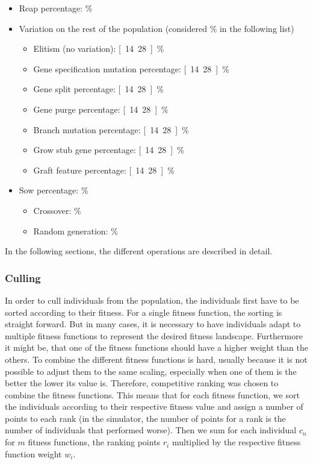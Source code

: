 \documentclass[main]{subfiles}
\begin{document}
\begin{itemize}
\item Reap percentage: \unit[30]{\%}
\item Variation on the rest of the population (considered \unit[100]{\%} in the following list)
\begin{itemize}
\item Elitism (no variation): \unit[14.28]{\%}
\item Gene specification mutation percentage: \unit[14.28]{\%}
\item Gene split percentage: \unit[14.28]{\%}
\item Gene purge percentage: \unit[14.28]{\%}
\item Branch mutation percentage: \unit[14.28]{\%}
\item Grow stub gene percentage: \unit[14.28]{\%}
\item Graft feature percentage: \unit[14.28]{\%}
\end{itemize}
\item Sow percentage: \unit[30]{\%}
\begin{itemize}
\item Crossover: \unit[50]{\%}
\item Random generation: \unit[50]{\%}
\end{itemize}
\label{item:ReaperPerc}
\end{itemize}

In the following sections, the different operations are described in detail.

\subsubsection{Culling}
\label{subsubsection:Culling}

In order to cull individuals from the population, the individuals first have to be sorted according to their fitness. %
%
For a single fitness function, the sorting is straight forward. %
%
But in many cases, it is necessary to have individuals adapt to multiple fitness functions to represent the desired fitness landscape. %
%
Furthermore it might be, that one of the fitness functions should have a higher weight than the others. %
%
To combine the different fitness functions is hard, usually because it is not possible to adjust them to the same scaling, especially when one of them is the better the lower its value is. %
%
Therefore, competitive ranking was chosen to combine the fitness functions. %
%
This means that for each fitness function, we sort the individuals according to their respective fitness value and assign a number of points to each rank (in the simulator, the number of points for a rank is the number of individuals that performed worse). %
%
Then we sum for each individual $c_n$ for $m$ fitness functions, the ranking points $r_i$ multiplied by the respective fitness function weight $w_i$. 
\end{document}

